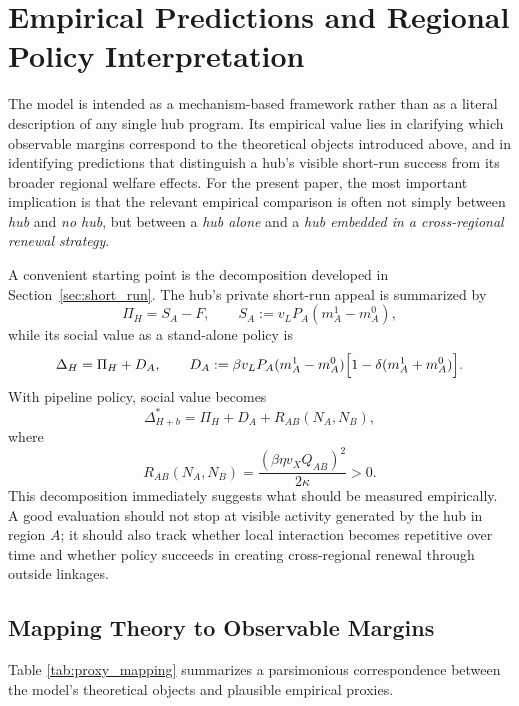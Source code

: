 \section{Empirical Predictions and Regional Policy Interpretation}
\label{sec:policy}

The model is intended as a mechanism-based framework rather than as a literal description of any single hub program. Its empirical value lies in clarifying which observable margins correspond to the theoretical objects introduced above, and in identifying predictions that distinguish a hub's visible short-run success from its broader regional welfare effects. For the present paper, the most important implication is that the relevant empirical comparison is often not simply between \emph{hub} and \emph{no hub}, but between a \emph{hub alone} and a \emph{hub embedded in a cross-regional renewal strategy}.

A convenient starting point is the decomposition developed in Section~\ref{sec:short_run}. The hub's private short-run appeal is summarized by
\[
\Pi_H = S_A-F,
\qquad
S_A:=v_LP_A(m_A^1-m_A^0),
\]
while its social value as a stand-alone policy is
\[
\Delta_H=\Pi_H+D_A,
\qquad
D_A:=\beta v_LP_A(m_A^1-m_A^0)\Bigl[1-\delta(m_A^1+m_A^0)\Bigr].
\]
With pipeline policy, social value becomes
\[
\Delta_{H+b}^*=\Pi_H+D_A+R_{AB}(N_A,N_B),
\]
where
\[
R_{AB}(N_A,N_B)=\frac{(\beta\eta v_XQ_{AB})^2}{2\kappa}>0.
\]
This decomposition immediately suggests what should be measured empirically. A good evaluation should not stop at visible activity generated by the hub in region $A$; it should also track whether local interaction becomes repetitive over time and whether policy succeeds in creating cross-regional renewal through outside linkages.

\subsection{Mapping Theory to Observable Margins}

Table \ref{tab:proxy_mapping} summarizes a parsimonious correspondence between the model's theoretical objects and plausible empirical proxies.


